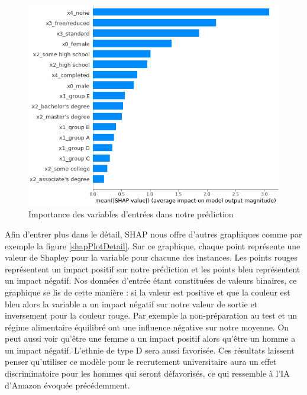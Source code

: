 \begin{figure}[h]
    \includegraphics[scale=0.6]{src_img/shapPlotBar.png}
    \caption{Importance des variables d'entrées dans notre prédiction}
    \label{shapPlotBar}
\end{figure}
Afin d'entrer plus dans le détail, SHAP nous offre d'autres graphiques comme par exemple la figure \ref{shapPlotDetail}. Sur ce graphique, chaque point représente une valeur de Shapley pour la variable pour chacune des instances. Les points rouges représentent un impact positif sur notre prédiction et les points bleu représentent un impact négatif. Nos données d'entrée étant constituées de valeurs binaires, ce graphique se lis de cette manière : si la valeur est positive et que la couleur est bleu alors la variable a un impact négatif sur notre valeur de sortie et inversement pour la couleur rouge. Par exemple la non-préparation au test et un régime alimentaire équilibré ont une influence négative sur notre moyenne. On peut aussi voir qu'être une femme a un impact positif alors qu'être un homme a un impact négatif. L’ethnie de type D sera aussi favorisée. Ces résultats laissent penser qu'utiliser ce modèle pour le recrutement universitaire aura un effet discriminatoire pour les hommes qui seront défavorisés, ce qui ressemble à l’IA d’Amazon évoquée précédemment.
